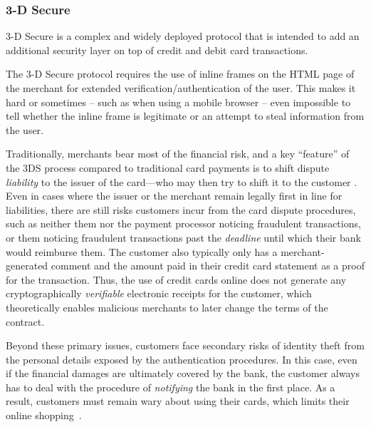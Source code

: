 \subsubsection{3-D Secure}
3-D Secure is a complex and widely deployed protocol that is intended to add an
additional security layer on top of credit and debit card transactions.

The 3-D Secure protocol requires the use of inline frames on the HTML page of
the merchant for extended verification/authentication of the user.  This makes
it hard or sometimes -- such as when using a mobile browser -- even impossible
to tell whether the inline frame is legitimate or an attempt to steal
information from the user.

Traditionally, merchants bear most of the financial risk, and a key
``feature'' of the 3DS process compared to traditional card payments
is to shift dispute {\em liability} to the issuer of the card---who
may then try to shift it to the customer \cite[\S2.4]{3DSsucks}.
%
%
Even in cases where the issuer or the merchant remain legally first in
line for liabilities, there are still risks customers incur from the
card dispute procedures, such as neither them nor the payment
processor noticing fraudulent transactions, or them noticing
fraudulent transactions past the {\em deadline} until which their bank
would reimburse them.  The customer also typically only has a
merchant-generated comment and the amount paid in their credit card
statement as a proof for the transaction.  Thus, the use of credit
cards online does not generate any cryptographically {\em verifiable}
electronic receipts for the customer, which theoretically enables
malicious merchants to later change the terms of the contract.

Beyond these primary issues, customers face secondary risks of
identity theft from the personal details exposed by the authentication
procedures. In this case, even if the financial damages are ultimately
covered by the bank, the customer always has to deal with the procedure
of {\em notifying} the bank in the first place.  As a result,
customers must remain wary about using their cards, which limits their
online shopping~\cite[p. 50]{ibi2014}.

